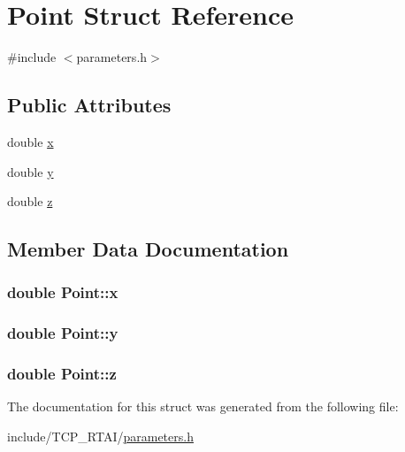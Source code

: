 \hypertarget{structPoint}{
\section{Point Struct Reference}
\label{structPoint}
}


{\ttfamily \#include $<$parameters.h$>$}

\subsection*{Public Attributes}
\begin{DoxyCompactItemize}
\item 
double \hyperlink{structPoint_ab99c56589bc8ad5fa5071387110a5bc7}{x}
\item 
double \hyperlink{structPoint_afa38be143ae800e6ad69ce8ed4df62d8}{y}
\item 
double \hyperlink{structPoint_a05ba3b1dfcb19430582ae953cbbfbded}{z}
\end{DoxyCompactItemize}


\subsection{Member Data Documentation}
\hypertarget{structPoint_ab99c56589bc8ad5fa5071387110a5bc7}{
\subsubsection[{x}]{\setlength{\rightskip}{0pt plus 5cm}double {\bf Point::x}}}
\label{structPoint_ab99c56589bc8ad5fa5071387110a5bc7}
\hypertarget{structPoint_afa38be143ae800e6ad69ce8ed4df62d8}{
\subsubsection[{y}]{\setlength{\rightskip}{0pt plus 5cm}double {\bf Point::y}}}
\label{structPoint_afa38be143ae800e6ad69ce8ed4df62d8}
\hypertarget{structPoint_a05ba3b1dfcb19430582ae953cbbfbded}{
\subsubsection[{z}]{\setlength{\rightskip}{0pt plus 5cm}double {\bf Point::z}}}
\label{structPoint_a05ba3b1dfcb19430582ae953cbbfbded}


The documentation for this struct was generated from the following file:\begin{DoxyCompactItemize}
\item 
include/TCP\_\-RTAI/\hyperlink{include_2TCP__RTAI_2parameters_8h}{parameters.h}\end{DoxyCompactItemize}
